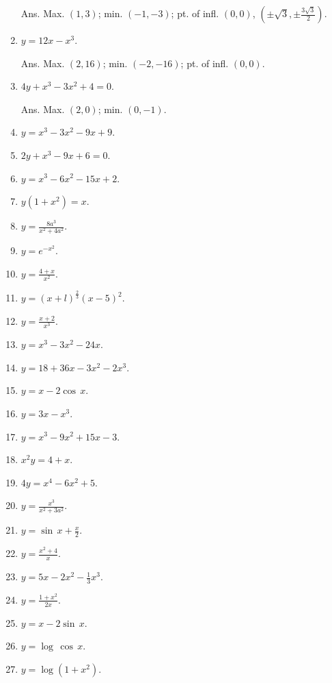 \begin{enumerate}
Ans. Max. $(1, 3)$; min. $(-1, -3)$; pt. of infl. $(0, 0)$, 
$\left ( \pm \sqrt{3}, \pm \frac{3\sqrt{3}}{2} \right )$.

\item
$y = 12x - x^3$.

Ans. Max. $(2, 16)$; min. $(-2, -16)$; pt. of infl. $(0, 0)$.

\item
$4y + x^3 - 3x^2 + 4 = 0$.

Ans. Max. $(2,0)$; min. $(0, -1)$.

\item
$y = x^3 - 3x^2 - 9x + 9$.

\item
$2y + x^3 - 9x + 6 = 0$.

\item
$y = x^3 - 6x^2 - 15x + 2$.

\item
$y(1 + x^2) = x$.

\item
$y = \frac{8a^3}{x^2 + 4a^2}$.

\item
$y = e^{-x^2}$.

\item
$y = \frac{4 + x}{x^2}$.

\item
$y = (x + l)^{\frac{2}{3}}(x - 5)^2$.

\item
$y = \frac{x + 2}{x^3}$.

\item
$y = x^3 - 3x^2 - 24x$.

\item
$y = 18 + 36x - 3x^2 - 2x^3$.

\item
$y = x - 2\cos\, x$.

\item
$y = 3x - x^3$.

\item
$y = x^3 - 9x^2 + 15x - 3$.

\item
$x^2y = 4 + x$.

\item
$4y = x^4 - 6x^2 + 5$.

\item
$y = \frac{x^3}{x^2 + 3a^2}$.

\item
$y = \sin\, x + \frac{x}{2}$.

\item
$y = \frac{x^2 + 4}{x}$.

\item
$y = 5x - 2x^2 - \frac{1}{3}x^3$.

\item
$y = \frac{1 + x^2}{2x}$.

\item
$y = x - 2\sin\, x$.

\item
$y = \log\, \cos\, x$.

\item
$y = \log(1 + x^2)$.

\end{enumerate}
